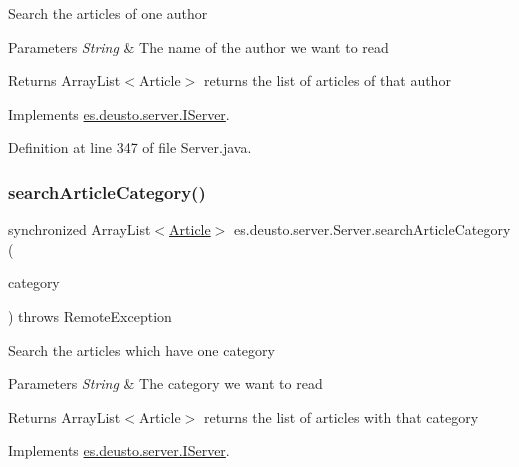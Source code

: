Search the articles of one author 
\begin{DoxyParams}{Parameters}
{\em String} & The name of the author we want to read \\
\hline
\end{DoxyParams}
\begin{DoxyReturn}{Returns}
Array\+List$<$\+Article$>$ returns the list of articles of that author 
\end{DoxyReturn}


Implements \hyperlink{interfacees_1_1deusto_1_1server_1_1_i_server_a92b587f25a7043b24d44f326d1c7b7ae}{es.\+deusto.\+server.\+I\+Server}.



Definition at line 347 of file Server.\+java.

\mbox{\label{classes_1_1deusto_1_1server_1_1_server_ab2729689bb71bd707881b563cdf2a006}} 
\subsubsection{\texorpdfstring{search\+Article\+Category()}{searchArticleCategory()}}
{\footnotesize\ttfamily synchronized Array\+List$<$\hyperlink{classes_1_1deusto_1_1server_1_1jdo_1_1_article}{Article}$>$ es.\+deusto.\+server.\+Server.\+search\+Article\+Category (\begin{DoxyParamCaption}\item[{String}]{category }\end{DoxyParamCaption}) throws Remote\+Exception}

Search the articles which have one category 
\begin{DoxyParams}{Parameters}
{\em String} & The category we want to read \\
\hline
\end{DoxyParams}
\begin{DoxyReturn}{Returns}
Array\+List$<$\+Article$>$ returns the list of articles with that category 
\end{DoxyReturn}


Implements \hyperlink{interfacees_1_1deusto_1_1server_1_1_i_server_ab08ccd2295e983571cf50431d273393a}{es.\+deusto.\+server.\+I\+Server}.



